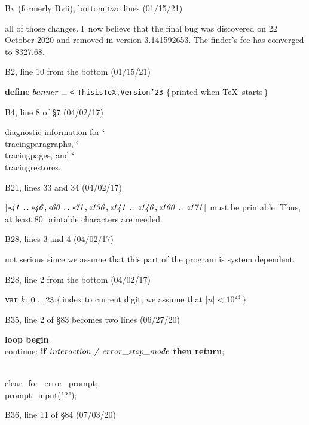 \bugonpage Bv {(formerly Bvii)}, bottom two lines (01/15/21)

\eightpoint\noindent
all of those changes.
I~now believe that the final bug was discovered on 22 October 2020
and removed in version 3.141592653. %
The finder's fee has converged to \$327.68.

\hsize=35pc

\bugonpage B2, line 10 from the bottom (01/15/21)

\ninepoint\noindent\hskip10pt
{\bf define} $\\{banner}\equiv\hbox{\tt\char'23}$%
{\tt This\]is\]TeX,\]Version\char'23}\quad
$\{\,$printed when \TeX\ starts$\,\}$

\bugonpage B4, line 8 of \S7 (04/02/17)

\tenpoint\noindent
diagnostic information for \.{\char`\\tracingparagraphs},
\.{\char`\\tracingpages}, and \.{\char`\\tracingrestores}.

\bugonpage B21, lines 33 and 34 (04/02/17)

\def\Oct#1{\hbox{\rm\char'23\kern-.2em\it#1\/\kern.05em}} %
\tenpoint\noindent
$[\Oct{41}\to\Oct{46},\Oct{60}%
\to\Oct{71},\Oct{136},\Oct{141}\to\Oct{146},\Oct{160}\to\Oct{171}]$ must be printable.
Thus, at least 80 printable characters are needed.

\bugonpage B28, lines 3 and 4 (04/02/17)

\tenpoint\noindent
not serious since we assume that this
part of the program is system dependent.

\bugonpage B28, line 2 from the bottom (04/02/17)

\ninepoint\noindent\quad
{\bf var} $k$: $0\mathrel{.\,.}23$;\quad$\{\,$index to current digit; we assume
 that $\vert n\vert<10^{23}\,\}$

\bugonpage B35, line 2 of \S83 becomes two lines (06/27/20)

\ninepoint\noindent\quad
{\bf loop begin} \\{continue}: {\bf if} $\\{interaction}\ne\\{error\_stop\_mode}$
  {\bf then return};\par
\noindent\qquad
\\{clear\_for\_error\_prompt}; \ \\{prompt\_input}(\.{"?\]"});

\bugonpage B36, line 11 of \S84 (07/03/20)

